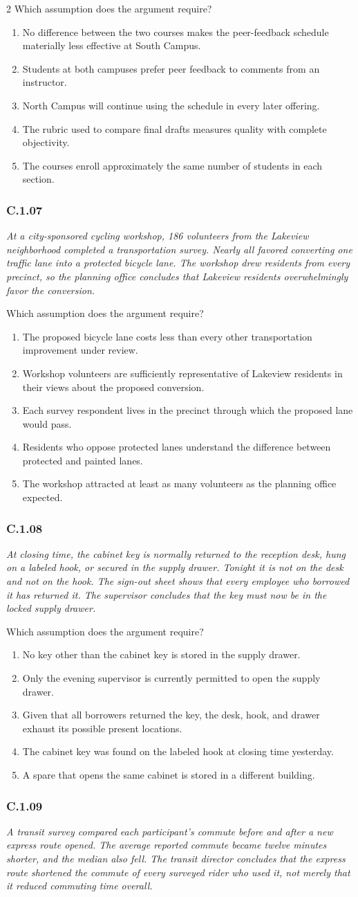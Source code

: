 \documentclass[10pt]{extarticle}
\newcommand{\choice}[1]{\item #1}
\newcommand{\bankitem}[1]{\subsubsection*{#1}}
\begin{document}
\begin{multicols}{2}
Which assumption does the argument require?
\begin{enumerate}[label=(\alph*)]
  \choice{No difference between the two courses makes the peer-feedback schedule materially less effective at South Campus.}
  \choice{Students at both campuses prefer peer feedback to comments from an instructor.}
  \choice{North Campus will continue using the schedule in every later offering.}
  \choice{The rubric used to compare final drafts measures quality with complete objectivity.}
  \choice{The courses enroll approximately the same number of students in each section.}
\end{enumerate}
\bankitem{C.1.07}
\emph{At a city-sponsored cycling workshop, 186 volunteers from the Lakeview neighborhood completed a transportation survey. Nearly all favored converting one traffic lane into a protected bicycle lane. The workshop drew residents from every precinct, so the planning office concludes that Lakeview residents overwhelmingly favor the conversion.}

Which assumption does the argument require?
\begin{enumerate}[label=(\alph*)]
  \choice{The proposed bicycle lane costs less than every other transportation improvement under review.}
  \choice{Workshop volunteers are sufficiently representative of Lakeview residents in their views about the proposed conversion.}
  \choice{Each survey respondent lives in the precinct through which the proposed lane would pass.}
  \choice{Residents who oppose protected lanes understand the difference between protected and painted lanes.}
  \choice{The workshop attracted at least as many volunteers as the planning office expected.}
\end{enumerate}
\bankitem{C.1.08}
\emph{At closing time, the cabinet key is normally returned to the reception desk, hung on a labeled hook, or secured in the supply drawer. Tonight it is not on the desk and not on the hook. The sign-out sheet shows that every employee who borrowed it has returned it. The supervisor concludes that the key must now be in the locked supply drawer.}

Which assumption does the argument require?
\begin{enumerate}[label=(\alph*)]
  \choice{No key other than the cabinet key is stored in the supply drawer.}
  \choice{Only the evening supervisor is currently permitted to open the supply drawer.}
  \choice{Given that all borrowers returned the key, the desk, hook, and drawer exhaust its possible present locations.}
  \choice{The cabinet key was found on the labeled hook at closing time yesterday.}
  \choice{A spare that opens the same cabinet is stored in a different building.}
\end{enumerate}
\bankitem{C.1.09}
\emph{A transit survey compared each participant's commute before and after a new express route opened. The average reported commute became twelve minutes shorter, and the median also fell. The transit director concludes that the express route shortened the commute of every surveyed rider who used it, not merely that it reduced commuting time overall.}


\end{multicols}
\end{document}
